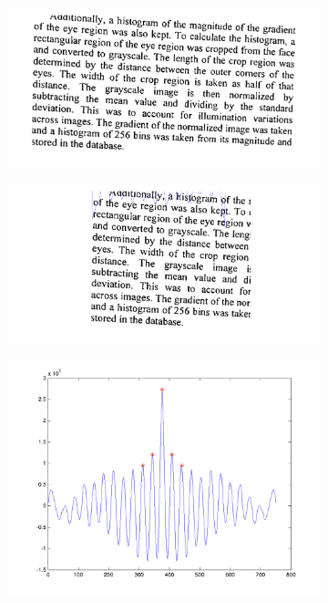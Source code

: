 \documentclass{report}
\begin{document}
\begin{figure}%
\setcounter{subfigure}{0}
\centering
\begin{subfigure}{.33\columnwidth}
\includegraphics[width=\columnwidth]{textblockskew.png}%
\label{textblock}
\end{subfigure}\hfill%
\begin{subfigure}{.33\columnwidth}
\includegraphics[width=\columnwidth]{texthistskew.png}%
\label{texthist}
\end{subfigure}
\begin{subfigure}{.33\columnwidth}
\includegraphics[width=\columnwidth]{textautoskew.png}%

\end{subfigure}
\end{figure}
\end{document}
